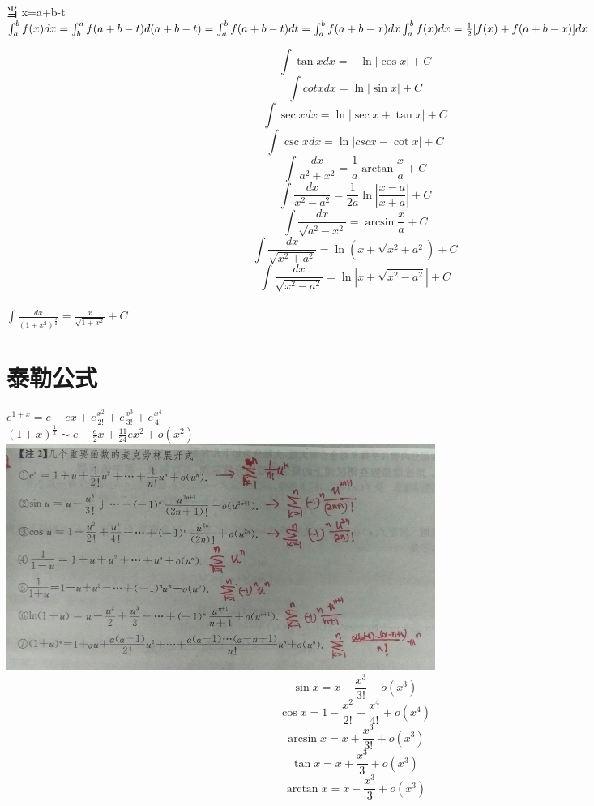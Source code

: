 \documentclass[UTF8]{ctexart}
\begin{document}
当 x=a+b-t \\
$ \int_a^b f(x) dx = \int_b^a f(a+b-t)d(a+b-t)=\int_a^bf(a+b-t)dt=\int_a^b f(a+b-x) dx \\
\int_a^b f(x) dx = \frac{1}{2} [ f(x) + f(a+b-x) ] dx$

$$ \int \tan x dx = - \ln |\cos x | +C$$
$$ \int cot x dx = \ln|\sin x| +C$$
$$ \int \sec x dx = \ln |\sec x+ \tan x| +C$$
$$ \int \csc x dx = \ln|csc x-\cot x | +C $$
$$ \int \frac{dx}{a^2+x^2}=\frac{1}{a} \arctan \frac{x}{a} +C $$
$$ \int \frac{dx}{x^2-a^2}=\frac{1}{2a} \ln \left| \frac{x-a}{x+a} \right| +C$$
$$ \int \frac{dx}{\sqrt{a^2-x^2}}=\arcsin \frac{x}{a}+C$$
$$ \int \frac {dx}{\sqrt{x^2+a^2}}=\ln {(x+ \sqrt{x^2+a^2})}+C$$
$$ \int \frac{dx}{\sqrt{x^2-a^2}}= \ln | x+\sqrt{x^2-a^2}|+C$$ \\
$\int \frac{dx}{{(1+x^2)}^\frac{3}{2}}=\frac{x}{\sqrt{1+x^2}} +C $ \\

\section{泰勒公式}
$ e^{1+x}=e+ex+e \frac{x^2}{2!} + e \frac{x^3}{3!}+e\frac{x^4}{4!}$ \\
$ (1+x)^{\frac{1}{x}} \sim e-\frac{e}{2}x+\frac{11}{24}ex^2+o(x^2)$ \\
\includegraphics[width=14cm]{9345E7/F04F85A8EB6EABFF18D6BE71383F2472.jpg}
$$ \sin x=x-\frac{x^3}{3!}+o(x^3)$$
$$ \cos x=1-\frac{x^2}{2!}+\frac{x^4}{4!}+o(x^4)$$
$$ \arcsin x=x+\frac{x^3}{3!}+o(x^3)$$
$$ \tan x=x+\frac{x^3}{3}+o(x^3)$$
$$ \arctan x=x-\frac{x^3}{3}+o(x^3)$$
\end{document}
